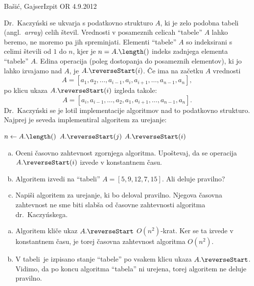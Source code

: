 \begin{naloga}{Bašić, Gajser}{Izpit OR 4.9.2012}
\begin{vprasanje}
Dr.~Kaczyński se ukvarja s podatkovno strukturo $A$,
ki je zelo podobna tabeli (angl.~{\em array}) celih števil.
Vrednosti v posameznih celicah ``tabele'' $A$ lahko beremo,
ne moremo pa jih spreminjati.
Elementi ``tabele'' $A$ so indeksirani s celimi števili od $1$ do $n$,
kjer je $n = A.\length()$ indeks zadnjega elementa ``tabele'' $A$.
Edina operacija (poleg dostopanja do posameznih elementov),
ki jo lahko izvajamo nad $A$, je $A.\reverseStart(i)$.
Če ima na začetku $A$ vrednosti
$$
A = [a_1, a_2, \dots, a_{i-1}, a_i, a_{i+1}, \dots, a_{n-1}, a_n],
$$
po klicu ukaza $A.\reverseStart(i)$ izgleda takole:
$$
A = [a_i, a_{i-1}, \dots, a_2, a_1, a_{i+1}, \dots, a_{n-1}, a_n] .
$$
Dr.~Kaczyński se je lotil implementacije algoritmov
nad to podatkovno strukturo.
Najprej je seveda implementiral algoritem za urejanje:
\begin{small}
\begin{algorithmic}
\State $n \gets A.\length()$
            \State $A.\reverseStart(j)$
            \State $A.\reverseStart(i)$
        \EndIf
    \EndFor
\EndFor
\end{algorithmic}
\end{small}

\begin{enumerate}[(a)]
\item Oceni časovno zahtevnost zgornjega algoritma.
Upoštevaj, da se operacija $A.\reverseStart(i)$ izvede v konstantnem času.

\item Algoritem izvedi na ``tabeli'' $A = [5, 9, 12, 7, 15]$.
Ali deluje pravilno?

\item Napiši algoritem za urejanje, ki bo deloval pravilno.
Njegova časovna zahtevnost ne sme biti slabša
od časovne zahtevnosti algoritma dr.~Kaczyńskega.
\end{enumerate}
\end{vprasanje}

\begin{odgovor}
\begin{enumerate}[(a)]
\item Algoritem kliče ukaz $A.\reverseStart$ $O(n^2)$-krat.
Ker se ta izvede v kon\-stant\-nem času,
je torej časovna zahtevnost algoritma $O(n^2)$.

\item V tabeli~
je izpisano stanje ``tabele'' po vsakem klicu ukaza $A.\reverseStart$.
Vidimo, da po koncu algoritma ``tabela'' ni urejena,
torej algoritem ne deluje pravilno.


\end{enumerate}
\end{odgovor}
\end{naloga}
